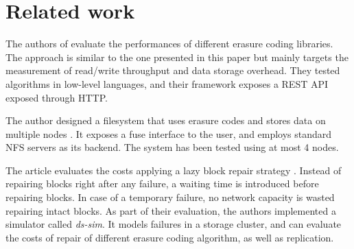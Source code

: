 \section{Related work}




The authors of \autocite{Burihabwa2016} evaluate the performances of different erasure coding libraries. The approach is similar to the one presented in this paper but mainly targets
the measurement of read/write throughput and data storage overhead. They tested algorithms in low-level languages, and their framework exposes a REST API exposed through HTTP.


The author designed a filesystem that uses erasure codes and stores data on multiple nodes \autocite{hyfs}.
It exposes a \ac{fuse} interface to the user, and employs standard NFS servers as its backend.
The system has been tested using at most 4 nodes.


The article evaluates the costs applying a lazy block repair strategy \autocite{Silberstein2014}.
Instead of repairing blocks right after any failure, a waiting time is introduced before repairing blocks.
In case of a temporary failure, no network capacity is wasted repairing intact blocks.
As part of their evaluation, the authors implemented a simulator called \textit{ds-sim}.
It models failures in a storage cluster, and can evaluate the costs of repair of different erasure coding algorithm, as well as replication.
